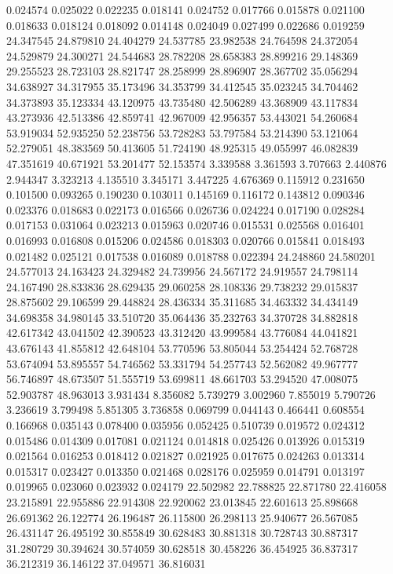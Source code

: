 0.024574
0.025022
0.022235
0.018141
0.024752
0.017766
0.015878
0.021100
0.018633
0.018124
0.018092
0.014148
0.024049
0.027499
0.022686
0.019259
24.347545
24.879810
24.404279
24.537785
23.982538
24.764598
24.372054
24.529879
24.300271
24.544683
28.782208
28.658383
28.899216
29.148369
29.255523
28.723103
28.821747
28.258999
28.896907
28.367702
35.056294
34.638927
34.317955
35.173496
34.353799
34.412545
35.023245
34.704462
34.373893
35.123334
43.120975
43.735480
42.506289
43.368909
43.117834
43.273936
42.513386
42.859741
42.967009
42.956357
53.443021
54.260684
53.919034
52.935250
52.238756
53.728283
53.797584
53.214390
53.121064
52.279051
48.383569
50.413605
51.724190
48.925315
49.055997
46.082839
47.351619
40.671921
53.201477
52.153574
3.339588
3.361593
3.707663
2.440876
2.944347
3.323213
4.135510
3.345171
3.447225
4.676369
0.115912
0.231650
0.101500
0.093265
0.190230
0.103011
0.145169
0.116172
0.143812
0.090346
0.023376
0.018683
0.022173
0.016566
0.026736
0.024224
0.017190
0.028284
0.017153
0.031064
0.023213
0.015963
0.020746
0.015531
0.025568
0.016401
0.016993
0.016808
0.015206
0.024586
0.018303
0.020766
0.015841
0.018493
0.021482
0.025121
0.017538
0.016089
0.018788
0.022394
24.248860
24.580201
24.577013
24.163423
24.329482
24.739956
24.567172
24.919557
24.798114
24.167490
28.833836
28.629435
29.060258
28.108336
29.738232
29.015837
28.875602
29.106599
29.448824
28.436334
35.311685
34.463332
34.434149
34.698358
34.980145
33.510720
35.064436
35.232763
34.370728
34.882818
42.617342
43.041502
42.390523
43.312420
43.999584
43.776084
44.041821
43.676143
41.855812
42.648104
53.770596
53.805044
53.254424
52.768728
53.674094
53.895557
54.746562
53.331794
54.257743
52.562082
49.967777
56.746897
48.673507
51.555719
53.699811
48.661703
53.294520
47.008075
52.903787
48.963013
3.931434
8.356082
5.739279
3.002960
7.855019
5.790726
3.236619
3.799498
5.851305
3.736858
0.069799
0.044143
0.466441
0.608554
0.166968
0.035143
0.078400
0.035956
0.052425
0.510739
0.019572
0.024312
0.015486
0.014309
0.017081
0.021124
0.014818
0.025426
0.013926
0.015319
0.021564
0.016253
0.018412
0.021827
0.021925
0.017675
0.024263
0.013314
0.015317
0.023427
0.013350
0.021468
0.028176
0.025959
0.014791
0.013197
0.019965
0.023060
0.023932
0.024179
22.502982
22.788825
22.871780
22.416058
23.215891
22.955886
22.914308
22.920062
23.013845
22.601613
25.898668
26.691362
26.122774
26.196487
26.115800
26.298113
25.940677
26.567085
26.431147
26.495192
30.855849
30.628483
30.881318
30.728743
30.887317
31.280729
30.394624
30.574059
30.628518
30.458226
36.454925
36.837317
36.212319
36.146122
37.049571
36.816031
